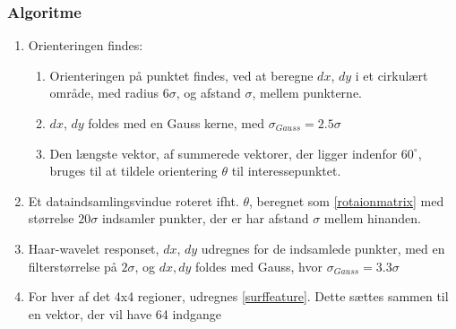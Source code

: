 \subsubsection*{Algoritme}
\begin{enumerate}
\item Orienteringen findes: \begin{enumerate}

	\item Orienteringen på punktet findes, ved at beregne $dx$, $dy$ i et cirkulært område, med radius $6\sigma$, og afstand $\sigma$, mellem punkterne. 
	\item $dx$, $dy$ foldes med en Gauss kerne, med $\sigma_{Gauss} = 2.5\sigma $
	\item Den længste vektor, af summerede vektorer, der ligger indenfor $60^{\circ}$, bruges til at tildele orientering $\theta$ til interessepunktet.
\end{enumerate}
\item Et dataindsamlingsvindue roteret ifht. $\theta$, beregnet som \eqref{rotaionmatrix} med størrelse $20\sigma$ indsamler punkter, der er har afstand $\sigma$ mellem hinanden.
\item Haar-wavelet responset, $dx$, $dy$ udregnes for de indsamlede punkter, med en filterstørrelse på $2\sigma$, og $dx, dy$ foldes med Gauss, hvor $\sigma_{Gauss} = 3.3\sigma$
\item For hver af det 4x4 regioner, udregnes \eqref{surffeature}. Dette sættes sammen til en vektor, der vil have 64 indgange
\end{enumerate}